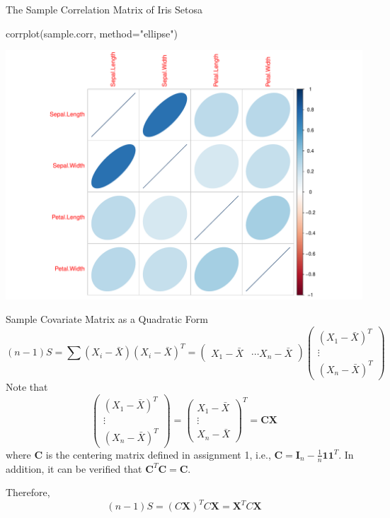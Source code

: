 \documentclass[
  ignorenonframetext,
]{beamer}
\newenvironment{Shaded}{\begin{snugshade}}{\end{snugshade}}
\newcommand{\AttributeTok}[1]{\textcolor[rgb]{0.77,0.63,0.00}{#1}}
\newcommand{\FunctionTok}[1]{\textcolor[rgb]{0.00,0.00,0.00}{#1}}
\newcommand{\NormalTok}[1]{#1}
\newcommand{\StringTok}[1]{\textcolor[rgb]{0.31,0.60,0.02}{#1}}
\begin{document}
\begin{frame}[fragile]{The Sample Correlation Matrix of Iris Setosa}
\protect\hypertarget{the-sample-correlation-matrix-of-iris-setosa-2}{}
\begin{Shaded}
\begin{Highlighting}[]
\FunctionTok{corrplot}\NormalTok{(sample.corr, }\AttributeTok{method=}\StringTok{"ellipse"}\NormalTok{)}
\end{Highlighting}
\end{Shaded}

\includegraphics[width=0.8\linewidth]{Lecture03_RandomV_files/figure-beamer/unnamed-chunk-7-1}
\end{frame}

\begin{frame}{Sample Covariate Matrix as a Quadratic Form}
\protect\hypertarget{sample-covariate-matrix-as-a-quadratic-form}{}
\[(n-1)S = \sum (X_i- \bar X) (X_i- \bar X)^T=
\begin{pmatrix}X_1 - \bar X & \cdots X_n -\bar X\end{pmatrix}
\begin{pmatrix}(X_1 - \bar X)^T \\ \vdots \\(X_n - \bar X)^T\end{pmatrix}
\] Note that
\[\begin{pmatrix}(X_1 - \bar X)^T \\ \vdots \\(X_n - \bar X)^T\end{pmatrix}= \begin{pmatrix}X_1 - \bar X \\ \vdots \\ X_n - \bar X\end{pmatrix}^T=\mathbf C\mathbf X\]
where \(\mathbf C\) is the centering matrix defined in assignment 1,
i.e., \(\mathbf C = \mathbf I_n - \frac{1}{n} \mathbf 1 \mathbf 1^T\).
In addition, it can be verified that \(\mathbf C^T\mathbf C=\mathbf C\).

Therefore, \[(n-1)S=(C\mathbf X)^T C\mathbf X= \mathbf X^T C \mathbf X\]
\end{frame}
\end{document}
